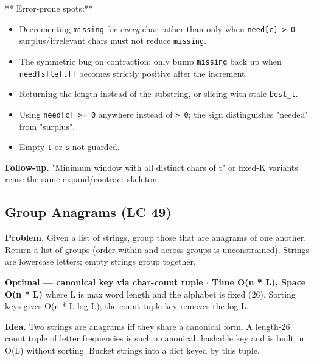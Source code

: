 \documentclass[11pt]{article}
\providecommand{\tightlist}{\setlength{\itemsep}{1pt}\setlength{\parskip}{0pt}}
\begin{document}
** Error-prone spots:**

\begin{itemize}
\tightlist
\item
  Decrementing \texttt{missing} for \emph{every} char rather than only when \texttt{need{[}c{]}\ \textgreater{}\ 0} --- surplus/irrelevant chars must not reduce \texttt{missing}.
\item
  The symmetric bug on contraction: only bump \texttt{missing} back up when \texttt{need{[}s{[}left{]}{]}} becomes strictly positive after the increment.
\item
  Returning the length instead of the substring, or slicing with stale \texttt{best\_l}.
\item
  Using \texttt{need{[}c{]}\ \textgreater{}=\ 0} anywhere instead of \texttt{\textgreater{}\ 0}; the sign distinguishes "needed" from "surplus".
\item
  Empty \texttt{t} or \texttt{s} not guarded.
\end{itemize}

\textbf{Follow-up.} "Minimum window with all distinct chars of t" or fixed-K variants reuse the same expand/contract skeleton.

\subsection{Group Anagrams (LC 49)}\label{group-anagrams-lc-49}

\textbf{Problem.} Given a list of strings, group those that are anagrams of one another. Return a list of groups (order within and across groups is unconstrained). Strings are lowercase letters; empty strings group together.

\textbf{Optimal --- canonical key via char-count tuple \(\cdot\) Time O(n * L), Space O(n * L)} where L is max word length and the alphabet is fixed (26). Sorting keys gives O(n * L log L); the count-tuple key removes the log L.

\textbf{Idea.} Two strings are anagrams iff they share a canonical form. A length-26 count tuple of letter frequencies is such a canonical, hashable key and is built in O(L) without sorting. Bucket strings into a dict keyed by this tuple.

\end{document}
